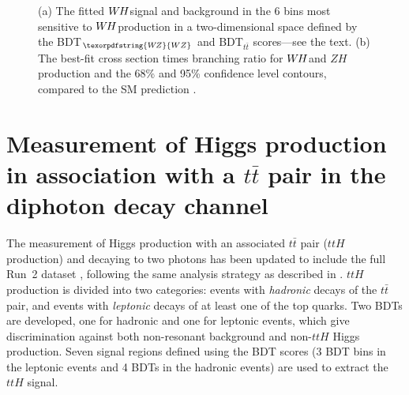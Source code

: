 \documentclass{moriond}
\def\wh{\texorpdfstring{\ensuremath{W\kern -0.1em H}\xspace}{WH\xspace}}
\def\wz{\texorpdfstring{\ensuremath{W\kern -0.1em Z}\xspace}{WZ\xspace}}
\def\zh{\ensuremath{ZH}\xspace}
\begin{document}
\begin{figure}[!htbp]
  \centering
  \caption{
    (a) The fitted \wh signal and background in the 6 bins most sensitive to \wh production in a
    two-dimensional space defined by the BDT$_{\wz}$ and BDT$_{t\bar t}$ scores---see the text.
    (b) The best-fit cross section times branching ratio for \wh and \zh production and the 68\% and
    95\% confidence level contours, compared to the SM prediction \cite{HIGG-2017-14}.
  }
  \label{fig:ww_vh}
\end{figure}

\section{Measurement of Higgs production in association with a $t\bar t$ pair in the diphoton decay channel}\label{sec:ttH_yy}

The measurement of Higgs production with an associated $t\bar t$ pair ($ttH$ production) and decaying
to two photons has been updated to include the full Run~2 dataset \cite{ATLAS-CONF-2019-004},
following the same analysis strategy as described in \cite{Aaboud:2018urx}. $ttH$ production is
divided into two categories: events with {\itshape hadronic} decays of the $t\bar t$ pair, and
events with {\itshape leptonic} decays of at least one of the top quarks. Two BDTs are developed, one
for hadronic and one for leptonic events, which give discrimination against both non-resonant
background and non-$ttH$ Higgs production. Seven signal regions defined using the BDT scores
(3 BDT bins in the leptonic events and 4 BDTs in the hadronic events) are used to extract the $ttH$
signal.
\end{document}
